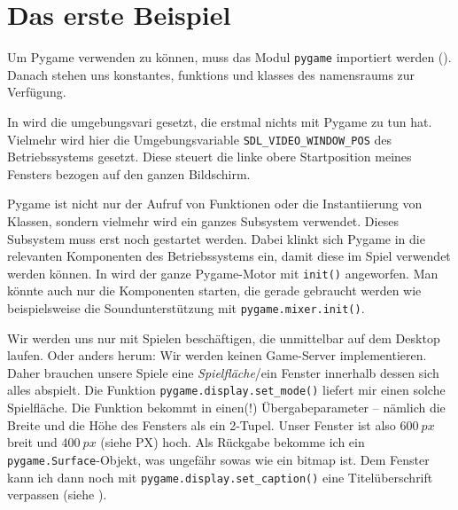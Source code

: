 \section{Das erste Beispiel}


Um Pygame verwenden zu können, muss das Modul \texttt{pygame} importiert werden (). Danach stehen uns \glspl{konstante}, \glspl{funktion} und \glspl{klasse} des \Gls{namensraum}s zur Verfügung. 

In   wird die \Gls{umgebungsvari} gesetzt, die erstmal nichts mit Pygame zu tun hat. Vielmehr wird hier die Umgebungsvariable \texttt{SDL\_VIDEO\_WINDOW\_POS} des Betriebssystems gesetzt. Diese steuert die linke obere Startposition meines Fensters bezogen auf den ganzen Bildschirm. 

Pygame ist nicht nur der Aufruf von Funktionen oder die Instantiierung von Klassen, sondern vielmehr wird ein ganzes Subsystem verwendet. Dieses Subsystem muss erst noch gestartet werden. Dabei klinkt sich Pygame in die relevanten Komponenten des Betriebssystems ein, damit diese im Spiel verwendet werden können. In  wird der ganze Pygame-Motor mit \texttt{init()} angeworfen. Man könnte auch nur die Komponenten starten, die gerade gebraucht werden wie beispielsweise die Soundunterstützung mit \texttt{pygame.mixer.init()}.

Wir werden uns nur mit Spielen beschäftigen, die unmittelbar auf dem Desktop laufen. Oder anders herum: Wir werden keinen Game-Server implementieren. Daher brauchen unsere Spiele eine \emph{Spielfläche}/ein Fenster innerhalb dessen sich alles abspielt. Die Funktion \texttt{pygame.display.set\_mode()} liefert mir einen solche Spielfläche. Die Funktion bekommt in  einen(!) Übergabeparameter -- nämlich die Breite und die Höhe des Fensters als ein 2-Tupel. Unser Fenster ist also $600~px$ breit und $400~px$ (siehe \Gls{PX}) hoch. Als Rückgabe bekomme ich ein \texttt{pygame.Surface}-Objekt, was ungefähr sowas wie ein \Gls{bitmap} ist. Dem Fenster kann ich dann noch mit \texttt{pygame.display.set\_caption()} eine Titelüberschrift verpassen (siehe ).

